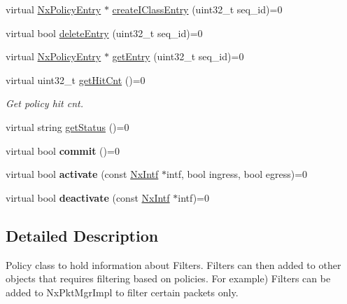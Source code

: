\begin{DoxyCompactItemize}
\item 
virtual \hyperlink{classnxos_1_1NxPolicyEntry}{Nx\-Policy\-Entry} $\ast$ \hyperlink{classnxos_1_1NxPolicyMap_aa8dbdddbdfb16a8bff9153f95e993540}{create\-I\-Class\-Entry} (uint32\-\_\-t seq\-\_\-id)=0
\item 
virtual bool \hyperlink{classnxos_1_1NxPolicyMap_adc24d111192b7c4a70c02af8dcb0a00e}{delete\-Entry} (uint32\-\_\-t seq\-\_\-id)=0
\item 
virtual \hyperlink{classnxos_1_1NxPolicyEntry}{Nx\-Policy\-Entry} $\ast$ \hyperlink{classnxos_1_1NxPolicyMap_a16e33fa1ce67b1e715771556c41d5778}{get\-Entry} (uint32\-\_\-t seq\-\_\-id)=0
\item 
\hypertarget{classnxos_1_1NxPolicyMap_a0a54953e6af70e05a0f369db3fbe71a2}{virtual uint32\-\_\-t \hyperlink{classnxos_1_1NxPolicyMap_a0a54953e6af70e05a0f369db3fbe71a2}{get\-Hit\-Cnt} ()=0}\label{classnxos_1_1NxPolicyMap_a0a54953e6af70e05a0f369db3fbe71a2}

\begin{DoxyCompactList}\small\item\em Get policy hit cnt. \end{DoxyCompactList}\item 
virtual string \hyperlink{classnxos_1_1NxPolicyMap_a25539ecebb6890a3a89c48d2a9868cc0}{get\-Status} ()=0
\item 
\hypertarget{classnxos_1_1NxPolicyMap_ad9ace7af4e62651dced83f811a4ee01b}{virtual bool {\bfseries commit} ()=0}\label{classnxos_1_1NxPolicyMap_ad9ace7af4e62651dced83f811a4ee01b}

\item 
\hypertarget{classnxos_1_1NxPolicyMap_a477fe8c91aed4e48ba3f99f390066ffe}{virtual bool {\bfseries activate} (const \hyperlink{classnxos_1_1NxIntf}{Nx\-Intf} $\ast$intf, bool ingress, bool egress)=0}\label{classnxos_1_1NxPolicyMap_a477fe8c91aed4e48ba3f99f390066ffe}

\item 
\hypertarget{classnxos_1_1NxPolicyMap_a57abd001ad4d2a411d6ae3b6044e5573}{virtual bool {\bfseries deactivate} (const \hyperlink{classnxos_1_1NxIntf}{Nx\-Intf} $\ast$intf)=0}\label{classnxos_1_1NxPolicyMap_a57abd001ad4d2a411d6ae3b6044e5573}

\end{DoxyCompactItemize}


\subsection{Detailed Description}
Policy class to hold information about Filters. Filters can then added to other objects that requires filtering based on policies. For example) Filters can be added to Nx\-Pkt\-Mgr\-Impl to filter certain packets only. 

